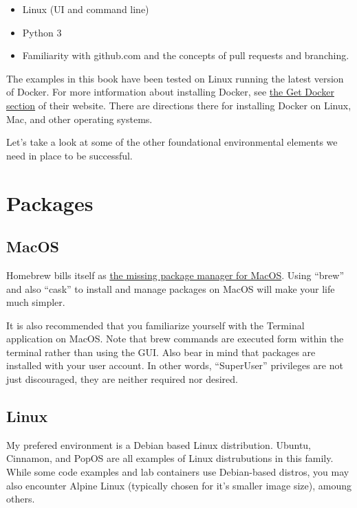 \begin{itemize}
	\item
	    Linux (UI and command line)
	\item 
        Python 3
	\item
	    Familiarity with github.com and the concepts of pull requests and branching.
\end{itemize}

\justify{}
The examples in this book have been tested on Linux running the latest version of Docker. For more
intformation about installing Docker, see \href{https://docs.docker.com/get-docker/}{the Get Docker section}
of their website. There are directions there for installing Docker on Linux, Mac, and other operating systems.

Let's take a look at some of the other foundational environmental elements we need in place to be successful.

\section{Packages}

\subsection{MacOS}

Homebrew bills itself as \href{https://brew.sh/}{the missing package manager for MacOS}. Using ``brew'' and also
``cask'' to install and manage packages on MacOS will make your life much simpler.

\justify{}
It is also recommended that you familiarize yourself with the Terminal application on MacOS. Note that brew
commands are executed form within the terminal rather than using the GUI. Also bear in mind that packages are
installed with your user account. In other words, ``SuperUser'' privileges are not just discouraged, they are
neither required nor desired.

\subsection{Linux}

My prefered environment is a Debian based Linux distribution. Ubuntu, Cinnamon, and PopOS are all examples of 
Linux distrubutions in this family. While some code examples and lab containers use Debian-based distros, you
may also encounter Alpine Linux (typically chosen for it's smaller image size), amoung others.

